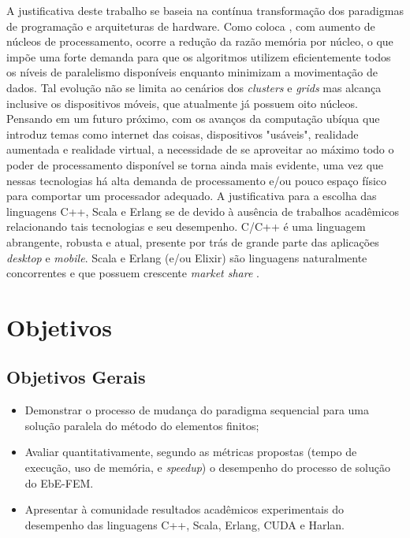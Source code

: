 \documentclass[
    12pt,               %
    openright,          %
    oneside,
    a4paper,            %
    english,            %
    french,             %
    spanish,            %
    brazil              %
    ]{abntex2}
\begin{document}
A justificativa deste trabalho se baseia na contínua transformação dos paradigmas de programação e arquiteturas de hardware. Como coloca , com aumento de núcleos de processamento, ocorre a redução da razão memória por núcleo, o que impõe uma forte demanda para que os algoritmos utilizem eficientemente todos os níveis de paralelismo disponíveis enquanto minimizam a movimentação de dados. Tal evolução não se limita ao cenários dos \textit{clusters} e \textit{grids} mas alcança inclusive os dispositivos móveis, que atualmente já possuem oito núcleos. Pensando em um futuro próximo, com os avanços da computação ubíqua que introduz temas como internet das coisas, dispositivos "usáveis", realidade aumentada e realidade virtual, a necessidade de se aproveitar ao máximo todo o poder de processamento disponível se torna ainda mais evidente, uma vez que nessas tecnologias há alta demanda de processamento e/ou pouco espaço físico para comportar um processador adequado. A justificativa para a escolha das linguagens C++, Scala e Erlang se de devido à ausência de trabalhos acadêmicos relacionando tais tecnologias e seu desempenho. C/C++ é uma linguagem abrangente, robusta e atual, presente por trás de grande parte das aplicações \textit{desktop} e \textit{mobile}. Scala e Erlang (e/ou Elixir) são linguagens naturalmente concorrentes e que possuem crescente \textit{market share} \nocite{erlang}\nocite{scala}.


\section{Objetivos}

\subsection{Objetivos Gerais}

	\begin{itemize}
		\item Demonstrar o processo de mudança do paradigma sequencial para uma solução paralela do método do elementos finitos;
		\item Avaliar quantitativamente, segundo as métricas propostas (tempo de execução, uso de memória, e \textit{speedup}) o desempenho do processo de solução do EbE-FEM.
		\item Apresentar à comunidade resultados acadêmicos experimentais do desempenho das  linguagens C++, Scala, Erlang, CUDA e Harlan.
	\end{itemize}
		
\end{document}
